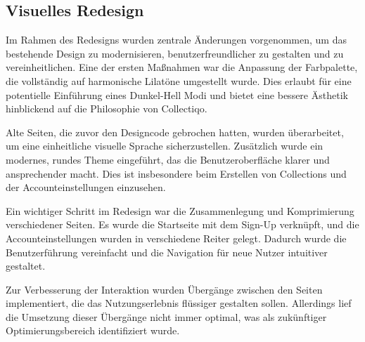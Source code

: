 \subsection{Visuelles Redesign}\label{subsec:subsection-three-two}

Im Rahmen des Redesigns wurden zentrale Änderungen vorgenommen, um das bestehende Design zu modernisieren, benutzerfreundlicher zu gestalten und zu vereinheitlichen.
Eine der ersten Maßnahmen war die Anpassung der Farbpalette, die vollständig auf harmonische Lilatöne umgestellt wurde.
Dies erlaubt für eine potentielle Einführung eines Dunkel-Hell Modi und bietet eine bessere Ästhetik hinblickend auf die Philosophie von Collectiqo.

Alte Seiten, die zuvor den Designcode gebrochen hatten, wurden überarbeitet, um eine einheitliche visuelle Sprache sicherzustellen.
Zusätzlich wurde ein modernes, rundes Theme eingeführt, das die Benutzeroberfläche klarer und ansprechender macht.
Dies ist insbesondere beim Erstellen von Collections und der Accounteinstellungen einzusehen.

Ein wichtiger Schritt im Redesign war die Zusammenlegung und Komprimierung verschiedener Seiten.
Es wurde die Startseite mit dem Sign-Up verknüpft, und die Accounteinstellungen wurden in verschiedene Reiter gelegt.
Dadurch wurde die Benutzerführung vereinfacht und die Navigation für neue Nutzer intuitiver gestaltet.

Zur Verbesserung der Interaktion wurden Übergänge zwischen den Seiten implementiert, die das Nutzungserlebnis flüssiger gestalten sollen.
Allerdings lief die Umsetzung dieser Übergänge nicht immer optimal, was als zukünftiger Optimierungsbereich identifiziert wurde.